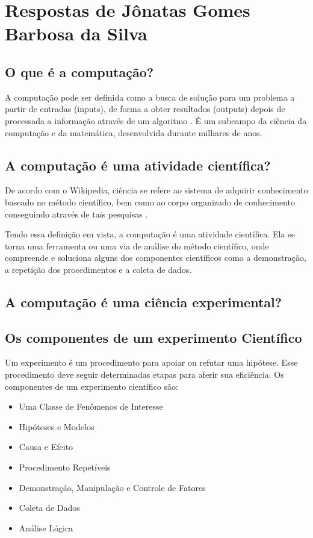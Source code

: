 \section{Respostas de Jônatas Gomes Barbosa da Silva}

\subsection{O que é a computação?}
A computação pode ser definida como a busca de solução para um problema a partir de entradas (inputs), de forma a obter resultados (outputs) depois de processada a informação através de um algoritmo \citet{wikipedia_computacao_2022}. É um subcampo da ciência da computação e da matemática, desenvolvida durante milhares de anos.

\subsection{A computação é uma atividade científica?}
De acordo com o Wikipedia, ciência se refere ao sistema de adquirir conhecimento baseado no método científico, bem como ao corpo organizado de conhecimento conseguindo através de tais pesquisas \cite{wikipedia_ciencia_2022}.

Tendo essa definição em vista, a computação é uma atividade científica. Ela se torna uma ferramenta ou uma via de análise do método científico, onde compreende e soluciona alguns dos componentes científicos como a demonstração, a repetição dos procedimentos e a coleta de dados. 

\subsection{A computação é uma ciência experimental?}


\subsection{Os componentes de um experimento Científico}
Um \gls{experimento} é um procedimento para apoiar ou refutar uma hipótese. Esse procedimento deve seguir determinadas etapas para aferir sua eficiência. Os componentes de um experimento científico são:
\begin{itemize}
    \item Uma Classe de Fenômenos de Interesse
    \item Hipóteses e Modelos
    \item Causa e Efeito
    \item Procedimento Repetíveis
    \item Demonstração, Manipulação e Controle de Fatores
    \item Coleta de Dados
    \item Análise Lógica
\end{itemize}

